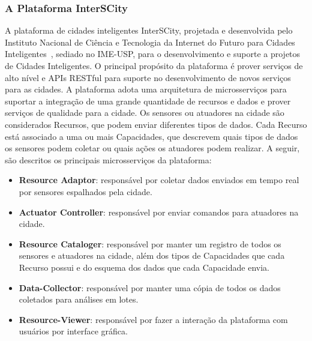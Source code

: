
\subsubsection{A Plataforma InterSCity}
A plataforma de cidades inteligentes InterSCity, projetada e desenvolvida pelo Instituto Nacional de Ciência e Tecnologia da Internet do Futuro para Cidades Inteligentes~\citep{del2019design}, sediado no IME-USP, para o desenvolvimento e suporte a projetos de Cidades Inteligentes. O principal propósito da plataforma é prover serviços de alto nível e APIs RESTful para suporte no desenvolvimento de novos serviços para as cidades. A plataforma adota uma arquitetura de microsserviços para suportar a integração de uma grande quantidade de recursos e dados e prover serviços de qualidade para a cidade. Os sensores ou atuadores na cidade são considerados Recursos, que podem enviar diferentes tipos de dados. Cada Recurso está associado a uma ou mais Capacidades, que descrevem quais tipos de dados os sensores podem coletar ou quais ações os atuadores podem realizar. A seguir, são descritos os principais microsserviços da plataforma:


\begin{itemize}
\item \textbf{Resource Adaptor}: responsável por coletar dados enviados em tempo real por sensores espalhados pela cidade.
\item \textbf{Actuator Controller}: responsável por enviar comandos para atuadores na cidade.
\item \textbf{Resource Cataloger}: responsável por manter um registro de todos os sensores e atuadores na cidade, além dos tipos de Capacidades que cada Recurso possui e do esquema dos dados que cada Capacidade envia.
\item \textbf{Data-Collector}: responsável por manter uma cópia de todos os dados coletados para análises em lotes.
\item \textbf{Resource-Viewer}: responsável por fazer a interação da plataforma com usuários por interface gráfica.
\end{itemize}

